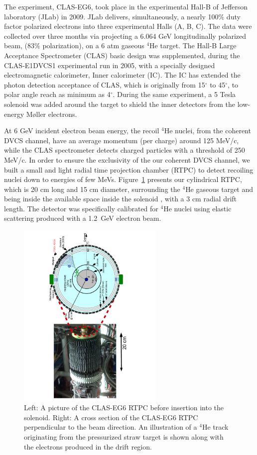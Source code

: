 \documentclass[nofootinbib,twocolumn,showpacs,prl,superscriptaddress,secnumarabic,amssymb,nobibnotes,aps,floatfix]{revtex4}
\begin{document}

The experiment, CLAS-EG6, took place in the experimental Hall-B of Jefferson 
laboratory (JLab) in 2009. JLab delivers, simultaneously, a nearly 100\% duty 
factor polarized electrons into three experimental Halls (A, B, C). The data 
were collected over three months via projecting a 6.064 GeV longitudinally 
polarized beam, (83$\%$ polarization), on a 6 atm gaseous $^4$He target.  The 
Hall-B Large Acceptance Spectrometer (CLAS) basic design \cite{CLAS_ref} was 
supplemented, during the CLAS-E1DVCS1 experimental run \cite{Girod:2007aa} in 
2005, with a specially designed electromagnetic calorimeter, Inner calorimeter 
(IC). The IC has extended the photon detection acceptance of CLAS, which is 
originally from 15$^{\circ}$ to 45$^{\circ}$, to polar angle reach as minimum 
as 4$^{\circ}$.  During the same experiment, a 5 Tesla solenoid was added 
around the target to shield the inner detectors from the low-energy M\o ller 
electrons.

At 6 GeV incident electron beam energy, the recoil $^4$He nuclei, from the 
coherent DVCS channel, have an average momentum (per charge) around 125 MeV/c, 
while the CLAS spectrometer detects charged particles with a threshold of 250 
MeV/c. In order to ensure the exclusivity of the our coherent DVCS channel, we 
built a small and light radial time projection chamber (RTPC) to detect 
recoiling nuclei down to energies of few MeVs. Figure~\ref{fig:RTPC} presents 
our cylindrical RTPC, which is 20 cm long and 15 cm diameter, surrounding the 
$^4$He gaseous target and being inside the available space inside the solenoid 
, with a 3 cm radial drift length. The detector was specifically calibrated for 
$^4$He nuclei using elastic scattering produced with a 1.2~GeV electron beam.


\begin{figure}[tb]
\includegraphics[width=7.0cm,angle=-90]{figs/RTPC.pdf}
\vspace{-1.1cm}
\caption{Left: A picture of the CLAS-EG6 RTPC before insertion into the 
   solenoid. Right: A cross section of the CLAS-EG6 RTPC perpendicular to the 
   beam direction. An illustration of a $^4$He track originating from the 
   pressurized straw target is shown along with the electrons produced in the 
drift region.}
\label{fig:RTPC}
\end{figure}
\end{document}

